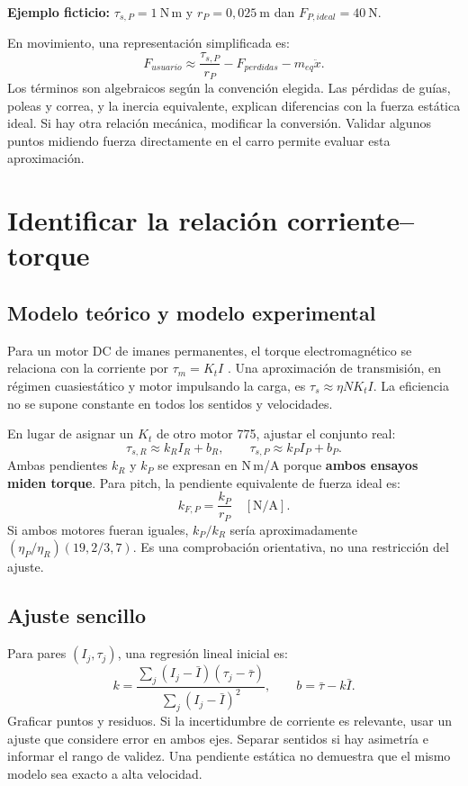 \documentclass[11pt,a4paper]{article}
\begin{document}
\textbf{Ejemplo ficticio:} $\tau_{s,P}=1\ \mathrm{N\,m}$ y $r_P=0{,}025\ \mathrm{m}$ dan $F_{P,ideal}=40\ \mathrm{N}$.

En movimiento, una representación simplificada es:
\begin{equation}
F_{usuario}\approx\frac{\tau_{s,P}}{r_P}-F_{perdidas}-m_{eq}\ddot{x}.
\end{equation}
Los términos son algebraicos según la convención elegida. Las pérdidas de guías, poleas y correa, y la inercia equivalente, explican diferencias con la fuerza estática ideal. Si hay otra relación mecánica, modificar la conversión. Validar algunos puntos midiendo fuerza directamente en el carro permite evaluar esta aproximación.

\section{Identificar la relación corriente--torque}
\subsection{Modelo teórico y modelo experimental}
Para un motor DC de imanes permanentes, el torque electromagnético se relaciona con la corriente por $\tau_m=K_tI$ \cite{nidec}. Una aproximación de transmisión, en régimen cuasiestático y motor impulsando la carga, es $\tau_s\approx\eta NK_tI$. La eficiencia no se supone constante en todos los sentidos y velocidades.

En lugar de asignar un $K_t$ de otro motor 775, ajustar el conjunto real:
\begin{equation}
\tau_{s,R}\approx k_R I_R+b_R,\qquad
\tau_{s,P}\approx k_P I_P+b_P.
\end{equation}
Ambas pendientes $k_R$ y $k_P$ se expresan en N\,m/A porque \textbf{ambos ensayos miden torque}. Para pitch, la pendiente equivalente de fuerza ideal es:
\begin{equation}
k_{F,P}=\frac{k_P}{r_P}\quad[\mathrm{N/A}].
\end{equation}
Si ambos motores fueran iguales, $k_P/k_R$ sería aproximadamente $(\eta_P/\eta_R)(19{,}2/3{,}7)$. Es una comprobación orientativa, no una restricción del ajuste.

\subsection{Ajuste sencillo}
Para pares $(I_j,\tau_j)$, una regresión lineal inicial es:
\begin{equation}
k=\frac{\sum_j(I_j-\bar I)(\tau_j-\bar\tau)}{\sum_j(I_j-\bar I)^2},
\qquad b=\bar\tau-k\bar I.
\end{equation}
Graficar puntos y residuos. Si la incertidumbre de corriente es relevante, usar un ajuste que considere error en ambos ejes. Separar sentidos si hay asimetría e informar el rango de validez. Una pendiente estática no demuestra que el mismo modelo sea exacto a alta velocidad.
\end{document}
